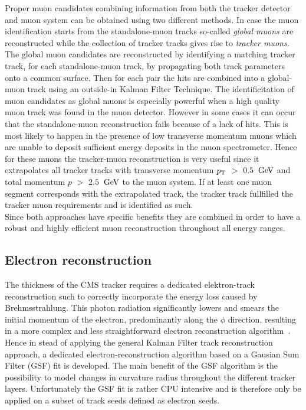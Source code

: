Proper muon candidates combining information from both the tracker detector and muon system can be obtained using two different methods. In case the muon identification starts from the standalone-muon tracks so-called \textit{global muons} are reconstructed while the collection of tracker tracks gives rise to \textit{tracker muons}.
The global muon candidates are reconstructed by identifying a matching tracker track, for each standalone-muon track, by propagating both track parameters onto a common surface. Then for each pair the hits are combined into a global-muon track using an outside-in Kalman Filter Technique. The identificitation of muon candidates as global muons is especially powerful when a high quality muon track was found in the muon detector. However in some cases it can occur that the standalone-muon reconstruction fails because of a lack of hits. This is most likely to happen in the presence of low transverse momentum muons which are unable to deposit sufficient energy deposits in the muon spectrometer. Hence for these muons the tracker-muon reconstruction is very useful since it extrapolates all tracker tracks with transverse momentum $p_{\rm T}$ $>$ $0.5$ $\, \mathrm{GeV}$ and total momentum $p$ $>$ $2.5$ $\, \mathrm{GeV}$ to the muon system. If at least one muon segment corresponds with the extrapolated track, the tracker track fullfilled the tracker muon requirements and is identified as such.
\\
Since both approaches have specific benefits they are combined in order to have a robust and highly efficient muon reconstruction throughout all energy ranges.
 
\subsection{Electron reconstruction} \label{subsec::Electron}

The thickness of the CMS tracker requires a dedicated elektron-track reconstruction such to correctly incorporate the energy loss caused by Brehmsstrahlung. 
This photon radiation significantly lowers and smears the initial momentum of the electron, predominantly along the $\phi$ direction, resulting in a more complex and less straightforward electron reconstruction algorithm~\cite{}.
Hence in stead of applying the general Kalman Filter track reconstruction approach, a dedicated electron-reconstruction algorithm based on a Gausian Sum Filter (GSF) fit is developed. The main benefit of the GSF algorithm is the possibility to model changes in curvature radius throughout the different tracker layers. 
Unfortunately the GSF fit is rather CPU intensive and is therefore only be applied on a subset of track seeds defined as electron seeds.

